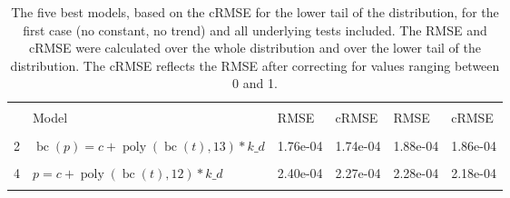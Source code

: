 \documentclass[12pt,a4paper]{article}
\DeclareMathOperator{\bc}{bc}
\DeclareMathOperator{\poly}{poly}
\begin{document}
\begin{table}[!h]

\caption{\label{tab:5_best_all_1}\label{tab:best_all_1} The five best models, based on the cRMSE for the lower tail of the distribution, for the first case (no constant, no trend) and all underlying tests included. The RMSE and cRMSE were calculated over the whole distribution and over the lower tail of the distribution. The cRMSE reflects the RMSE after correcting for values ranging between 0 and 1.}
\centering
\fontsize{10}{12}\selectfont
\begin{tabular}[t]{ll>{\raggedleft\arraybackslash}p{2cm}>{\raggedleft\arraybackslash}p{2cm}>{\raggedleft\arraybackslash}p{2cm}>{\raggedleft\arraybackslash}p{2cm}}
\toprule
\multicolumn{1}{c}{\textbf{}} & \multicolumn{1}{c}{\textbf{}} & \multicolumn{2}{c}{\textbf{Full Distribution}} & \multicolumn{2}{c}{\textbf{Lower Tail ($p \leq 0.2$)}} \\
\cmidrule(l{3pt}r{3pt}){3-4} \cmidrule(l{3pt}r{3pt}){5-6}
  & Model & RMSE & cRMSE & RMSE & cRMSE\\
\midrule
\cellcolor{gray!6}{1} & \cellcolor{gray!6}{$p = c + \poly\left( \bc(t), 13 \right) * k\_d$} & \cellcolor{gray!6}{1.79e-04} & \cellcolor{gray!6}{1.73e-04} & \cellcolor{gray!6}{1.73e-04} & \cellcolor{gray!6}{1.71e-04}\\
2 & $\bc(p) = c + \poly\left( \bc(t), 13 \right) * k\_d$ & 1.76e-04 & 1.74e-04 & 1.88e-04 & 1.86e-04\\
\cellcolor{gray!6}{3} & \cellcolor{gray!6}{$\bc(p) = c + \poly\left( \bc(t), 12 \right) * k\_d$} & \cellcolor{gray!6}{2.00e-04} & \cellcolor{gray!6}{1.95e-04} & \cellcolor{gray!6}{2.10e-04} & \cellcolor{gray!6}{2.05e-04}\\
4 & $p = c + \poly\left( \bc(t), 12 \right) * k\_d$ & 2.40e-04 & 2.27e-04 & 2.28e-04 & 2.18e-04\\
\cellcolor{gray!6}{5} & \cellcolor{gray!6}{$\bc(p) = c + \poly\left( \bc(t), 11 \right) * k\_d$} & \cellcolor{gray!6}{2.16e-04} & \cellcolor{gray!6}{2.09e-04} & \cellcolor{gray!6}{2.28e-04} & \cellcolor{gray!6}{2.19e-04}\\
\bottomrule
\end{tabular}
\end{table}
\end{document}
